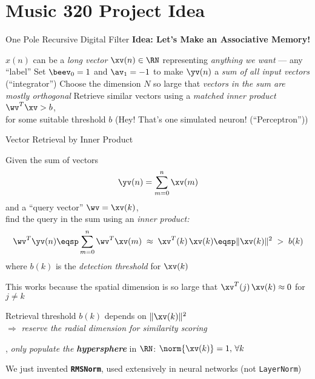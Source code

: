 \section[\sectopts,toc={Basic Idea}]{Music 320 Project Idea}

\begin{slide}[\slideopts,toc={One Pole Filter}]{One Pole Recursive Digital Filter}
\vspace{-2em}
\maybepause
\textbf{Idea: Let's Make an Associative Memory!}
\begin{itemize}
\mpitem $x(n)$ can be a \emph{long vector} $\xv(n)\in\RN$ representing \emph{anything we want} --- any ``label''
\mpitem Set $\beev_0 = 1$ and $\av_1 = -1$ to make $\yv(n)$ a \emph{sum of all input vectors} (``integrator'')
\mpitem Choose the dimension $N$ so large that \emph{vectors in the sum are mostly orthogonal}
\mpitem Retrieve similar vectors using a \emph{matched inner product} $\wv^T\xv > b$,\\
        for some suitable threshold $b$ (Hey! That's one simulated neuron! (``Perceptron''))
\end{itemize}
\end{slide}

\begin{slide}[\slideopts,toc={Inner Product}]{Vector Retrieval by Inner Product}

  Given the sum of vectors
  \[
  \yv(n) = \sum_{m=0}^n \xv(m)
  \]
  and a ``query vector'' $\wv = \xv(k)$,\\
  \maybepause
  find the query in the sum using an \emph{inner product:}
  \[
  \wv^T\yv(n) \eqsp \sum_{m=0}^n \wv^T\xv(m) \;\approx\; \xv^T(k)\,\xv(k) \eqsp \|\xv(k)\|^2 \;>\; b(k)
  \]
  where $b(k)$ is the \emph{detection threshold} for $\xv(k)$

  \begin{itemize}
  \mpitem This works because the spatial dimension is so large that $\xv^T(j)\,\xv(k)\approx 0$ for $j\ne k$

  \mpitem Retrieval threshold $b(k)$ depends on $\|\xv(k)\|^2$\\
  $\Rightarrow$ \emph{reserve the radial dimension for similarity scoring}

  \mpitem \Ie, \emph{only populate the \textbf{hypersphere}} in $\RN$: $\norm{\xv(k)} = 1, \, \forall k$

  \mpitem We just invented \textbf{\texttt{RMSNorm}}, used extensively in neural networks (not \texttt{LayerNorm})

  \end{itemize}

\end{slide}

